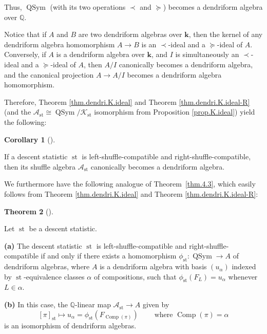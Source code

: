 \documentclass[numbers=enddot,12pt,final,onecolumn,notitlepage]{scrartcl}%
\theoremstyle{definition}
\newtheorem{theo}{Theorem}[section]
\newenvironment{theorem}[1][]
{\begin{theo}[#1]\begin{leftbar}}
{\end{leftbar}\end{theo}}
\newtheorem{coro}[theo]{Corollary}
\newenvironment{corollary}[1][]
{\begin{coro}[#1]\begin{leftbar}}
{\end{leftbar}\end{coro}}
\begin{document}
Thus, $\operatorname*{QSym}$ (with its two operations $\left.  \prec\right.  $
and $\left.  \succeq\right.  $) becomes a dendriform algebra over $\mathbb{Q}$.

Notice that if $A$ and $B$ are two dendriform algebras over $\mathbf{k}$, then
the kernel of any dendriform algebra homomorphism $A\rightarrow B$ is an
$\left.  \prec\right.  $-ideal and a $\left.  \succeq\right.  $-ideal of $A$.
Conversely, if $A$ is a dendriform algebra over $\mathbf{k}$, and $I$ is
simultaneously an $\left.  \prec\right.  $-ideal and a $\left.  \succeq
\right.  $-ideal of $A$, then $A/I$ canonically becomes a dendriform algebra,
and the canonical projection $A\rightarrow A/I$ becomes a dendriform algebra homomorphism.

Therefore, Theorem \ref{thm.dendri.K.ideal} and Theorem
\ref{thm.dendri.K.ideal-R} (and the $\mathcal{A}_{\operatorname*{st}}%
\cong\operatorname*{QSym}/\mathcal{K}_{\operatorname*{st}}$ isomorphism from
Proposition \ref{prop.K.ideal}) yield the following:

\begin{corollary}
\label{cor.dendri.quotient-dendri}If a descent statistic $\operatorname*{st}$
is left-shuffle-compatible and right-shuffle-compatible, then its shuffle
algebra $\mathcal{A}_{\operatorname*{st}}$ canonically becomes a dendriform algebra.
\end{corollary}

We furthermore have the following analogue of Theorem~\ref{thm.4.3}, which
easily follows from Theorem \ref{thm.dendri.K.ideal} and Theorem
\ref{thm.dendri.K.ideal-R}:

\begin{theorem}
\label{thm.dendri.4.3}Let $\operatorname*{st}$ be a descent statistic.

\textbf{(a)} The descent statistic $\operatorname*{st}$ is
left-shuffle-compatible and right-shuffle-compatible if and only if there
exists a homomorphism $\phi_{\operatorname*{st}}:\operatorname*{QSym}%
\rightarrow A$ of dendriform algebras, where $A$ is a dendriform algebra with
basis $\left(  u_{\alpha}\right)  $ indexed by $\operatorname*{st}%
$-equivalence classes $\alpha$ of compositions, such that $\phi
_{\operatorname*{st}}\left(  F_{L}\right)  =u_{\alpha}$ whenever $L\in\alpha$.

\textbf{(b)} In this case, the $\mathbb{Q}$-linear map $\mathcal{A}%
_{\operatorname*{st}}\rightarrow A$ given by%
\[
\left[  \pi\right]  _{\operatorname*{st}}\mapsto u_{\alpha}=\phi
_{\operatorname*{st}}\left(  F_{\operatorname*{Comp}\left(  \pi\right)
}\right)  \ \ \ \ \ \ \ \ \ \ \text{where }\operatorname*{Comp}\left(
\pi\right)  =\alpha
\]
is an isomorphism of dendriform algebras.
\end{theorem}
\end{document}
